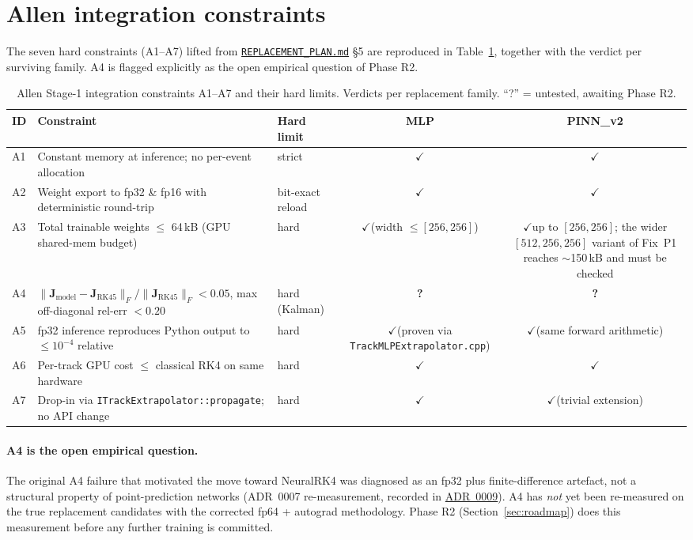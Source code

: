 \documentclass[11pt,a4paper]{article}
\newcommand{\Jac}{\mathbf{J}}
\newcommand{\cmark}{\ensuremath{\checkmark}}
\begin{document}
\section{Allen integration constraints}\label{sec:allen}

The seven hard constraints (A1--A7) lifted from
\href{run:../../experiments/gen_3/REPLACEMENT_PLAN.md}{\texttt{REPLACEMENT\_PLAN.md}}
§5 are reproduced in Table~\ref{tab:allen}, together with the verdict per
surviving family. A4 is flagged explicitly as the open empirical question
of Phase R2.

\begin{table}[h!]
\centering
\caption{Allen Stage-1 integration constraints A1--A7 and their hard
limits. Verdicts per replacement family. ``?'' = untested, awaiting
Phase R2.}
\label{tab:allen}
\small
\begin{tabularx}{\linewidth}{l X l c c}
\toprule
ID & Constraint & Hard limit & MLP & PINN\_v2 \\
\midrule
A1 & Constant memory at inference; no per-event allocation
   & strict
   & \cmark & \cmark \\
A2 & Weight export to fp32 \& fp16 with deterministic round-trip
   & bit-exact reload
   & \cmark & \cmark \\
A3 & Total trainable weights $\le$ 64\,kB (GPU shared-mem budget)
   & hard
   & \cmark (width $\le [256,256]$)
   & \cmark up to $[256,256]$; the wider $[512,256,256]$ variant of Fix~P1 reaches $\sim$150\,kB and must be checked \\
A4 & $\|\Jac_\mathrm{model} - \Jac_\mathrm{RK45}\|_F / \|\Jac_\mathrm{RK45}\|_F < 0.05$, max off-diagonal rel-err $<0.20$
   & hard (Kalman)
   & \textbf{?}
   & \textbf{?} \\
A5 & fp32 inference reproduces Python output to $\le 10^{-4}$ relative
   & hard
   & \cmark (proven via \texttt{TrackMLPExtrapolator.cpp})
   & \cmark (same forward arithmetic) \\
A6 & Per-track GPU cost $\le$ classical RK4 on same hardware
   & hard
   & \cmark & \cmark \\
A7 & Drop-in via \texttt{ITrackExtrapolator::propagate}; no API change
   & hard
   & \cmark & \cmark (trivial extension) \\
\bottomrule
\end{tabularx}
\end{table}

\paragraph{A4 is the open empirical question.} The original A4 failure that
motivated the move toward NeuralRK4 was diagnosed as an fp32 plus
finite-difference artefact, not a structural property of point-prediction
networks (ADR~0007 re-measurement, recorded in
\href{run:../../experiments/gen_3/For_Allen/docs/decisions/0009-replacement-goal-restated.md}{ADR~0009}).
A4 has \emph{not} yet been re-measured on the true replacement candidates
with the corrected fp64 + autograd methodology. Phase R2
(Section~\ref{sec:roadmap}) does this measurement before any further
training is committed.
\end{document}

